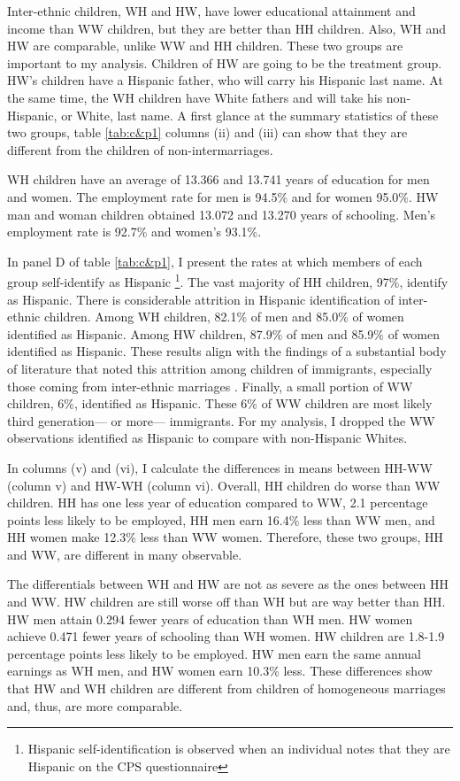 \documentclass{wptemp}
\begin{document}
Inter-ethnic children, WH and HW, have lower educational attainment and income than WW children, but they are better than HH children. Also, WH and HW are comparable, unlike WW and HH children. These two groups are important to my analysis. Children of HW are going to be the treatment group. HW's children have a Hispanic father, who will carry his Hispanic last name. At the same time, the WH children have White fathers and will take his non-Hispanic, or White, last name. A first glance at the summary statistics of these two groups, table \ref{tab:c&p1} columns (ii) and (iii) can show that they are different from the children of non-intermarriages. 

WH children have an average of 13.366 and 13.741 years of education for men and women. The employment rate for men is 94.5\% and for women 95.0\%. HW man and woman children obtained 13.072 and 13.270 years of schooling. Men's employment rate is 92.7\% and women's 93.1\%.

In panel D of table \ref{tab:c&p1}, I present the rates at which members of each group self-identify as Hispanic \footnote{Hispanic self-identification is observed when an individual notes that they are Hispanic on the CPS questionnaire}. The vast majority of HH children, 97\%, identify as Hispanic. There is considerable attrition in Hispanic identification of inter-ethnic children. Among WH children, 82.1\% of men and 85.0\% of women identified as Hispanic. Among HW children, 87.9\% of men and 85.9\% of women identified as Hispanic. These results align with the findings of a substantial body of literature that noted this attrition among children of immigrants, especially those coming from inter-ethnic marriages \citep{duncan2017complexity, duncan2018identifying, duncan2020new, antman2020ethnic}. Finally, a small portion of WW children, 6\%, identified as Hispanic. These 6\% of WW children are most likely third generation--- or more--- immigrants. For my analysis, I dropped the WW observations identified as Hispanic to compare with non-Hispanic Whites.

In columns (v) and (vi), I calculate the differences in means between HH-WW (column v) and HW-WH (column vi). Overall, HH children do worse than WW children. HH has one less year of education compared to WW, 2.1 percentage points less likely to be employed, HH men earn 16.4\% less than WW men, and HH women make 12.3\% less than WW women. Therefore, these two groups, HH and WW, are different in many observable.

The differentials between WH and HW are not as severe as the ones between HH and WW. HW children are still worse off than WH but are way better than HH. HW men attain 0.294 fewer years of education than WH men. HW women achieve 0.471 fewer years of schooling than WH women. HW children are 1.8-1.9 percentage points less likely to be employed. HW men earn the same annual earnings as WH men, and HW women earn 10.3\% less. These differences show that HW and WH children are different from children of homogeneous marriages and, thus, are more comparable.
\end{document}
